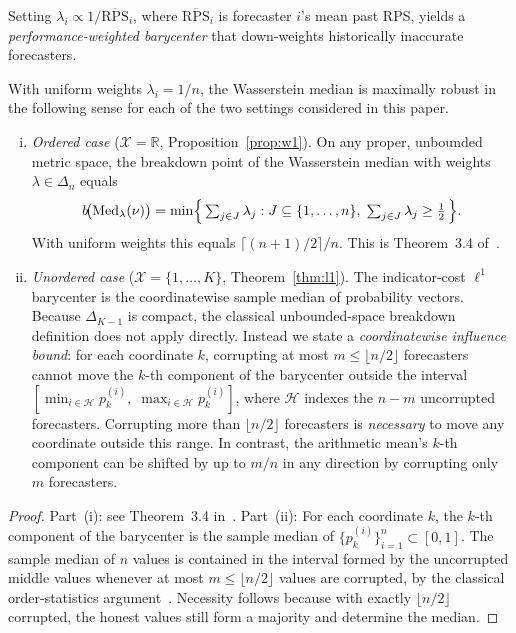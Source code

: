 Setting $\lambda_i \propto 1/\overline{\mathrm{RPS}}_i$, where $\overline{\mathrm{RPS}}_i$ is
forecaster $i$'s mean past RPS, yields a \emph{performance-weighted barycenter} that down-weights
historically inaccurate forecasters.

\begin{proposition}
\label{prop:breakdown}
With uniform weights $\lambda_i = 1/n$, the Wasserstein median is maximally robust in the
following sense for each of the two settings considered in this paper.

\begin{enumerate}[(i)]
\item \textit{Ordered case} ($\mathcal{X}=\mathbb{R}$, Proposition~\ref{prop:w1}).
On any proper, unbounded metric space, the breakdown point of the Wasserstein median with
weights $\lambda\in\Delta_n$ equals
\[
b\!\bigl(\mathrm{Med}_\lambda(\nu)\bigr)
=
\min\Bigl\{\,\textstyle\sum_{j\in J}\lambda_j :
    J \subseteq \{1,\ldots,n\},\;
    \textstyle\sum_{j\in J}\lambda_j \ge \tfrac12\,\Bigr\}.
\]
With uniform weights this equals $\lceil(n+1)/2\rceil/n$.
This is Theorem~3.4 of~\cite{carlier23}.

\item \textit{Unordered case} ($\mathcal{X}=\{1,\ldots,K\}$, Theorem~\ref{thm:l1}).
The indicator-cost $\ell^1$ barycenter is the coordinatewise sample median of probability
vectors.  Because $\Delta_{K-1}$ is compact, the classical unbounded-space breakdown
definition does not apply directly.  Instead we state a \emph{coordinatewise influence
bound}: for each coordinate $k$, corrupting at most $m \le \lfloor n/2 \rfloor$ forecasters
cannot move the $k$-th component of the barycenter outside the interval
$[\min_{i\in\mathcal{H}} p^{(i)}_k,\; \max_{i\in\mathcal{H}} p^{(i)}_k]$,
where $\mathcal{H}$ indexes the $n - m$ uncorrupted forecasters.
Corrupting more than $\lfloor n/2 \rfloor$ forecasters is \emph{necessary} to move any
coordinate outside this range.  In contrast, the arithmetic mean's $k$-th component can be
shifted by up to $m/n$ in any direction by corrupting only $m$ forecasters.
\end{enumerate}
\end{proposition}

\begin{proof}
Part~(i): see Theorem~3.4 in~\cite{carlier23}.  Part~(ii): For each coordinate $k$, the
$k$-th component of the barycenter is the sample median of $\{p^{(i)}_k\}_{i=1}^n \subset
[0,1]$.  The sample median of $n$ values is contained in the interval formed by the
uncorrupted middle values whenever at most $m \le \lfloor n/2 \rfloor$ values are corrupted,
by the classical order-statistics argument~\cite{lopuhaa1991}.  Necessity follows because
with exactly $\lfloor n/2 \rfloor$ corrupted, the honest values still form a majority and
determine the median.
\end{proof}

